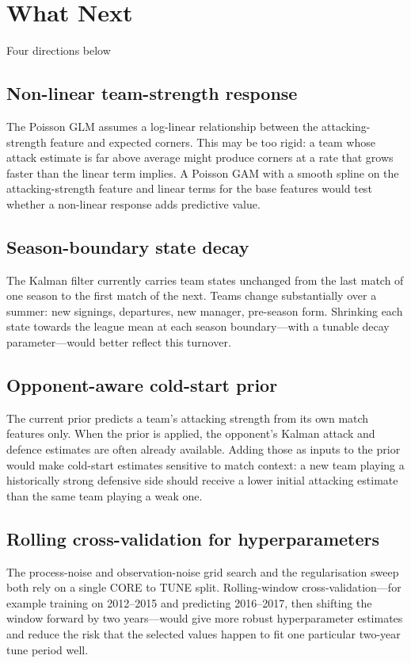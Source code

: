 \documentclass[11pt]{article}
\begin{document}
\section{What Next}

Four directions below

\subsection{Non-linear team-strength response}

The Poisson GLM assumes a log-linear relationship between the attacking-strength
feature and expected corners. This may be too rigid: a team whose attack
estimate is far above average might produce corners at a rate that grows faster
than the linear term implies. A Poisson GAM with a smooth spline on the
attacking-strength feature and linear terms for the base features would test
whether a non-linear response adds predictive value. 

\subsection{Season-boundary state decay}

The Kalman filter currently carries team states unchanged from the last match of
one season to the first match of the next. Teams change substantially over a
summer: new signings, departures, new manager, pre-season form. Shrinking each
state towards the league mean at each season boundary---with a tunable decay
parameter---would better reflect this turnover. 


\subsection{Opponent-aware cold-start prior}

The current prior predicts a team's attacking strength from its own match
features only. When the prior is applied, the opponent's Kalman attack and
defence estimates are often already available. Adding those as inputs to the
prior would make cold-start estimates sensitive to match context: a new team
playing a historically strong defensive side should receive a lower initial
attacking estimate than the same team playing a weak one.

\subsection{Rolling cross-validation for hyperparameters}

The process-noise and observation-noise grid search and the regularisation sweep
both rely on a single CORE to TUNE split. Rolling-window cross-validation---for
example training on 2012--2015 and predicting 2016--2017, then shifting the
window forward by two years---would give more robust hyperparameter estimates
and reduce the risk that the selected values happen to fit one particular
two-year tune period well.
\end{document}
